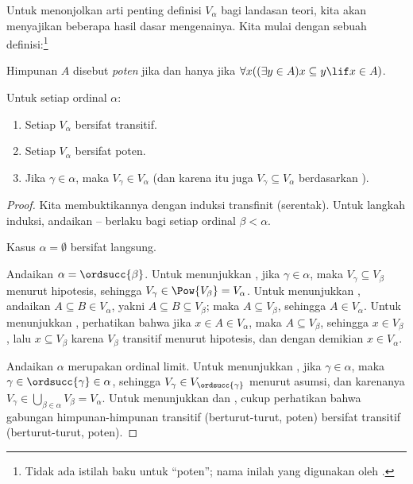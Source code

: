 \documentclass[../../../include/open-logic-section]{subfiles}
\begin{document}

Untuk menonjolkan arti penting definisi $V_\alpha$ bagi landasan teori, kita
akan menyajikan beberapa hasil dasar mengenainya. Kita mulai dengan sebuah
definisi:\footnote{Tidak ada istilah baku untuk ``poten''; nama inilah yang
digunakan oleh \citet{ButtonLT1}.}
\begin{defn}
	Himpunan $A$ disebut \emph{poten} jika dan hanya jika
	$\forall x((\exists y \in A)x \subseteq y \lif x \in A)$.
\end{defn}
\begin{lem}
Untuk setiap ordinal $\alpha$:
\begin{enumerate}
	\item{} Setiap $V_\alpha$ bersifat transitif.
	\item{} Setiap $V_\alpha$ bersifat poten.
	\item{} Jika $\gamma \in \alpha$, maka $V_\gamma
	\in V_\alpha$ (dan karena itu juga $V_\gamma \subseteq V_\alpha$
	berdasarkan ).
\end{enumerate}
\end{lem}

\begin{proof}
Kita membuktikannya dengan induksi transfinit (serentak). Untuk langkah
induksi, andaikan -- berlaku bagi setiap
ordinal $\beta < \alpha$.

Kasus $\alpha = \emptyset$ bersifat langsung.

Andaikan $\alpha = \ordsucc{\beta}$. Untuk menunjukkan
, jika $\gamma \in \alpha$, maka
$V_\gamma \subseteq V_\beta$ menurut hipotesis, sehingga
$V_\gamma \in \Pow{V_\beta} = V_\alpha$. Untuk menunjukkan
, andaikan $A \subseteq B \in V_\alpha$, yakni
$A \subseteq B \subseteq V_\beta$; maka $A \subseteq V_\beta$, sehingga
$A \in V_\alpha$. Untuk menunjukkan , perhatikan bahwa
jika $x \in A \in V_\alpha$, maka $A \subseteq V_\beta$, sehingga
$x \in V_\beta$, lalu $x \subseteq V_\beta$ karena $V_\beta$ transitif
menurut hipotesis, dan dengan demikian $x \in V_\alpha$.

Andaikan $\alpha$ merupakan ordinal limit. Untuk menunjukkan
, jika $\gamma \in \alpha$, maka
$\gamma \in \ordsucc{\gamma} \in \alpha$, sehingga
$V_\gamma \in V_{\ordsucc{\gamma}}$ menurut asumsi, dan karenanya
$V_\gamma \in \bigcup_{\beta \in \alpha} V_\beta = V_\alpha$. Untuk
menunjukkan  dan , cukup perhatikan
bahwa gabungan himpunan-himpunan transitif (berturut-turut, poten) bersifat
transitif (berturut-turut, poten).
\end{proof}
\end{document}

